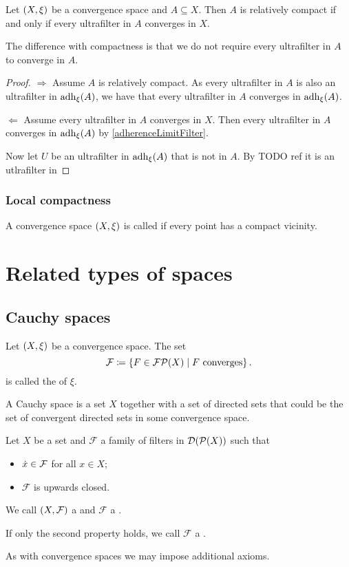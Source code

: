 \begin{lemma}
Let $\left( X,\xi \right)$ be a convergence space and $A\subseteq X$. Then $A$ is relatively compact \textup{if and only if} every ultrafilter in $A$ converges in $X$.
\end{lemma}
The difference with compactness is that we do not require every ultrafilter in $A$ to converge in $A$.
\begin{proof}
$\boxed{\Rightarrow}$ Assume $A$ is relatively compact. As every ultrafilter in $A$ is also an ultrafilter in $\operatorname{adh}_\xi(A)$, we have that every ultrafilter in $A$ converges in $\operatorname{adh}_\xi(A)$.

$\boxed{\Leftarrow}$ Assume every ultrafilter in $A$ converges in $X$. Then every ultrafilter in $A$ converges in $\operatorname{adh}_\xi(A)$ by \ref{adherenceLimitFilter}.

Now let $U$ be an ultrafilter in $\operatorname{adh}_\xi(A)$ that is not in $A$. By TODO ref it is an utlrafilter in
\end{proof}

\subsection{Local compactness}
\begin{definition}
A convergence space $\left( X, \xi \right)$ is called 
if every point has a compact vicinity.
\end{definition}

\chapter{Related types of spaces}
\section{Cauchy spaces}
\begin{definition}
Let $\left( X,\xi \right)$ be a convergence space. The set
\[ \mathcal{F} \coloneqq \left\{ F\in\operatorname{\mathcal{FP}}(X) \;\middle|\; \text{$F$ converges} \right\}. \]
is called the  of $\xi$.
\end{definition}
A Cauchy space is a set $X$ together with a set of directed sets that could be the set of convergent directed sets in some convergence space.
\begin{definition}
Let $X$ be a set and $\mathcal{F}$ a family of filters in $\operatorname{\mathcal{D}}(\operatorname{\mathcal{P}}(X))$ such that
\begin{itemize}
\item $\dot{x} \in \mathcal{F}$ for all $x\in X$;
\item $\mathcal{F}$ is upwards closed.
\end{itemize}
We call $\left( X, \mathcal{F} \right)$ a  and $\mathcal{F}$ a .

If only the second property holds, we call $\mathcal{F}$ a .
\end{definition}
As with convergence spaces we may impose additional axioms.

